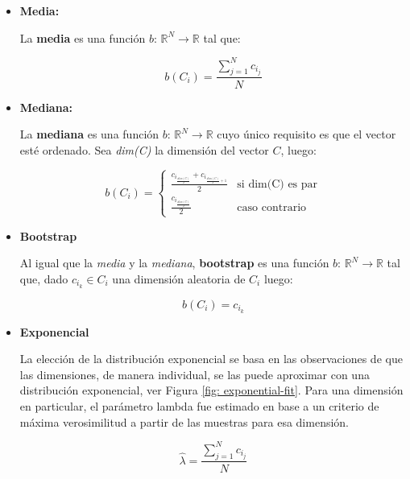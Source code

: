 	\begin{itemize}
	
	\item \textbf{Media:}
	
	La \textbf{media} es una función $\textit{b: }\mathbb{R}^{N} \rightarrow \mathbb{R}$ tal que:
	
	$$b(C_i) = \frac{\sum_{j=1}^N c_{i_j}}{N} $$

	\item \textbf{Mediana:}
	
	La \textbf{mediana} es una función $\textit{b: }\mathbb{R}^{N} \rightarrow \mathbb{R}$ cuyo único requisito es que el vector esté ordenado. Sea \textit{dim(C)} la dimensión del vector $C$, luego:
	
	\[
    		b(C_i) = 
		\begin{cases}
    			\frac{c_{i_{\frac{dim(C)}{2}}} + c_{i_{\frac{dim(C)}{2}+1}}}{2} & \text{si dim(C) es par}\\
    			\frac{c_{i_{\frac{dim(C)}{2}}}}{2} & \text{caso contrario}
		\end{cases}
	\]
	
	\item \textbf{Bootstrap}
	
	Al igual que la \textit{media} y la \textit{mediana}, \textbf{bootstrap} es una función $\textit{b: }\mathbb{R}^{N} \rightarrow \mathbb{R}$ tal que, dado $c_{i_k} \in C_{i}$ una dimensión aleatoria de $C_{i}$ luego:
	
	$$ b(C_i) = c_{i_k} $$

	\item \textbf{Exponencial}
	
	La elección de la distribución exponencial se basa en las observaciones de que las dimensiones, de manera individual, se las puede aproximar con una distribución exponencial, ver Figura \ref{fig: exponential-fit}. Para una dimensión en particular, el parámetro lambda fue estimado en base a un criterio de máxima verosimilitud a partir de las muestras para esa dimensión.
	
	$$\hat{\lambda} = \frac{\sum_{j=1}^N c_{i_j}}{N} $$
	

\end{itemize}
